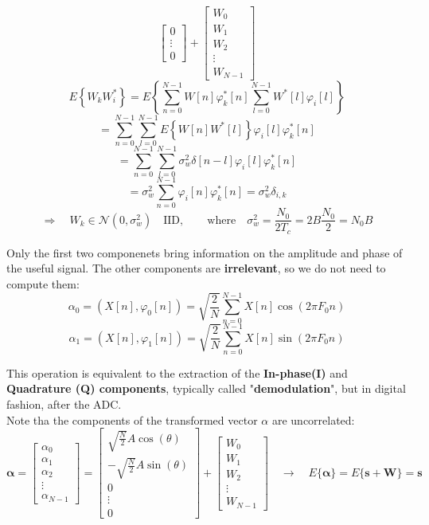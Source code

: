 \begin{itemize}
\[\begin{bmatrix}
    0 \\
    \vdots \\
    0
\end{bmatrix}
+
\begin{bmatrix}
    W_0 \\
    W_1 \\
    W_2 \\
    \vdots \\
    W_{N-1}
\end{bmatrix}
\]
\[
E\left\{ W_k W_i^* \right\} =
E\left\{ \sum_{n=0}^{N-1} W[n] \varphi_k^*[n] \sum_{l=0}^{N-1} W^*[l] \varphi_i[l] \right\}
\]
\[
= \sum_{n=0}^{N-1}\sum_{l=0}^{N-1} E\left\{ W[n] W^*[l] \right\} \varphi_i[l] \varphi_k^*[n]
\]
\[
= \sum_{n=0}^{N-1}\sum_{l=0}^{N-1} \sigma_w^2 \delta[n-l] \varphi_i[l] \varphi_k^*[n]
\]
\[
= \sigma_w^2 \sum_{n=0}^{N-1} \varphi_i[n] \varphi_k^*[n] = \sigma_w^2 \delta_{i,k}
\]
\[
\Rightarrow \quad W_k \in \mathcal{N}\left(0, \sigma_w^2 \right)\quad \text{IID}, \qquad \text{where}\quad \sigma_w^2 = \frac{N_0}{2 T_c} = 2B \frac{N_0}{2} = N_0 B
\]
\end{itemize}
\noindent Only the first two componenets bring information on the amplitude and phase of the useful signal. The other components are \textbf{irrelevant}, so we do not need to compute them:
\[
\alpha_0 = \left( X[n], \varphi_0[n] \right ) = \sqrt{\frac{2}{N}} \sum_{n=0}^{N-1} X[n] \cos(2\pi F_0 n)
\]
\[
\alpha_1 = \left( X[n], \varphi_1[n] \right ) = \sqrt{\frac{2}{N}} \sum_{n=0}^{N-1} X[n] \sin(2\pi F_0 n)
\]

\noindent This operation is equivalent to the extraction of the \textbf{In-phase(I)} and \textbf{Quadrature (Q) components}, typically called "\textbf{demodulation}", but in digital fashion, after the ADC.\\

\noindent Note tha the components of the transformed vector \(\alpha\) are uncorrelated:
\[
\mathbf{\alpha} =
\begin{bmatrix}
    \alpha_0 \\
    \alpha_1 \\
    \alpha_2 \\
    \vdots \\
    \alpha_{N-1}
\end{bmatrix}
=
\begin{bmatrix}
    \sqrt{\frac{N}{2}} A \cos(\theta) \\
    -\sqrt{\frac{N}{2}} A \sin(\theta) \\
    0 \\
    \vdots \\
    0
\end{bmatrix}
+
\begin{bmatrix}
    W_0 \\
    W_1 \\
    W_2 \\
    \vdots \\
    W_{N-1}
\end{bmatrix}
\quad \rightarrow \quad E\{\mathbf{\alpha}\} = E\{\mathbf{s} + \mathbf{W}\} = \mathbf{s}
\]

